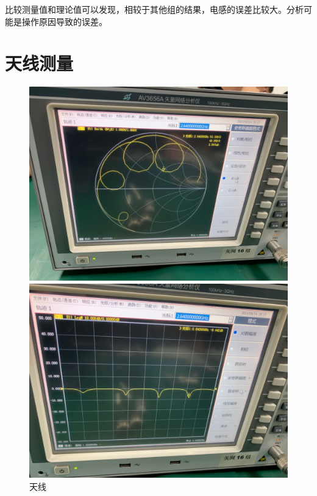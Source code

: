 \documentclass{../source/Experiment}
\begin{document}
            比较测量值和理论值可以发现，相较于其他组的结果，电感的误差比较大。分析可能是操作原因导致的误差。
    \section{天线测量}
        \begin{figure}[H]
            \centering
            \begin{minipage}[t]{0.3\textwidth}
                \centering
                \includegraphics[width=1\textwidth]{pic/天线}
                \caption{天线}
            \end{minipage}
            \begin{minipage}[t]{0.3\textwidth}
                \centering
                \includegraphics[width=1\textwidth]{pic/吸收峰}

\end{minipage}
\end{figure}
\end{document}
